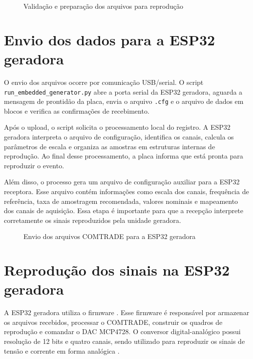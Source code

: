 \begin{figure}[H]
  \centering
  \caption{Validação e preparação dos arquivos para reprodução}
  \label{fig:validacao-arquivos}
\end{figure}

\section{Envio dos dados para a ESP32 geradora}

O envio dos arquivos ocorre por comunicação USB/serial. O script \texttt{run\_embedded\_generator.py} abre a porta serial da ESP32 geradora, aguarda a mensagem de prontidão da placa, envia o arquivo \texttt{.cfg} e o arquivo de dados em blocos e verifica as confirmações de recebimento.

Após o upload, o script solicita o processamento local do registro. A ESP32 geradora interpreta o arquivo de configuração, identifica os canais, calcula os parâmetros de escala e organiza as amostras em estruturas internas de reprodução. Ao final desse processamento, a placa informa que está pronta para reproduzir o evento.

Além disso, o processo gera um arquivo de configuração auxiliar para a ESP32 receptora. Esse arquivo contém informações como escala dos canais, frequência de referência, taxa de amostragem recomendada, valores nominais e mapeamento dos canais de aquisição. Essa etapa é importante para que a recepção interprete corretamente os sinais reproduzidos pela unidade geradora.

\begin{figure}[H]
  \centering
  \caption{Envio dos arquivos COMTRADE para a ESP32 geradora}
  \label{fig:upload-esp32-geradora}
\end{figure}

\section{Reprodução dos sinais na ESP32 geradora}

A ESP32 geradora utiliza o firmware . Esse firmware é responsável por armazenar os arquivos recebidos, processar o COMTRADE, construir os quadros de reprodução e comandar o DAC MCP4728. O conversor digital-analógico possui resolução de 12 bits e quatro canais, sendo utilizado para reproduzir os sinais de tensão e corrente em forma analógica \cite{microchip_mcp4728}.

